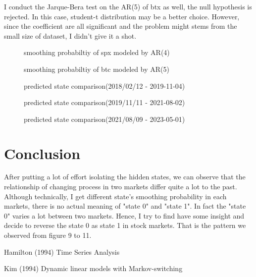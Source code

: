 \documentclass{article}
\begin{document}
I conduct the Jarque-Bera test on the AR(5) of btx as well, the null hypothesis is
rejected. In this case, student-t distribution may be a better choice. However, since 
the coefficient are all significant and the problem might stems from the small size
of dataset, I didn't give it a shot.

\newpage

\begin{figure}[h!]
  \centering
  
  \caption{smoothing probabiltiy of spx modeled by AR(4)}
\end{figure}


\begin{figure}[h!]
  \centering
  
  \caption{smoothing probabiltiy of btc modeled by AR(5)}
\end{figure}

\newpage

\begin{figure}[h!]
  \centering
  
  \caption{predicted state comparison(2018/02/12 - 2019-11-04)}
\end{figure}
\vspace{2cm}

\begin{figure}[h!]
  \centering
  
  \caption{predicted state comparison(2019/11/11 - 2021-08-02)}
\end{figure}

\newpage

\begin{figure}[h!]
  \centering
  
  \caption{predicted state comparison(2021/08/09 - 2023-05-01)}
\end{figure}

\section{Conclusion}

After putting a lot of effort isolating the hidden states, we can observe that
the relationship of changing process in two markets differ quite a lot to the past.
Although technically, I get different state's smoothing probability in each markets, 
there is no actual meaning of "state 0" and "state 1". In fact the "state 0" varies 
a lot between two markets. Hence, I try to find have some insight and decide to 
reverse the state 0 as state 1 in stock markets. That is the pattern we observed from
figure 9 to 11.

\newpage

\begin{thebibliography}{9}
     Hamilton (1994) Time Series Analysis
    
     Kim (1994) Dynamic linear models with Markov-switching
    
    \end{thebibliography}
\end{document}
